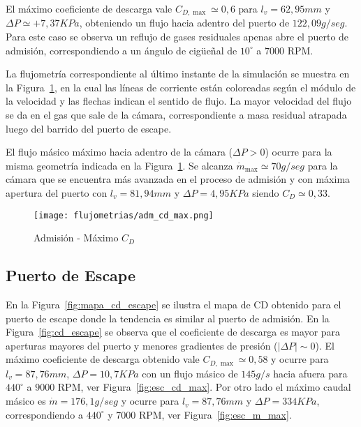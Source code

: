 El máximo coeficiente de descarga vale $C_{D,\max}\simeq 0,6$ para
$l_{v}=62,95 mm$ y $\Delta P\simeq +7,37 KPa$, obteniendo un flujo hacia adentro
del puerto de $122,09 g/seg$.
%
Para este caso se observa un reflujo de gases residuales apenas abre el puerto
de admisión, correspondiendo a un ángulo de cigüeñal de $10^{\circ}$ a $7000$
RPM.

La flujometría correspondiente al último instante de la simulación se muestra en
la Figura~\ref{fig:adm_cd_max}, en la cual las líneas de corriente están
coloreadas según el módulo de la velocidad y las flechas indican el sentido de
flujo.
%
La mayor velocidad del flujo se da en el gas que sale de la cámara,
correspondiente a masa residual atrapada luego del barrido del puerto de escape.


El flujo másico máximo hacia adentro de la cámara ($\Delta P>0$) ocurre para la
misma geometría indicada en la Figura~\ref{fig:adm_cd_max}.
%
Se alcanza $\dot{m}_{\max}\simeq 70 g/seg$ para la cámara que se encuentra más
avanzada en el proceso de admisión y con máxima apertura del puerto con
$l_{v}=81,94 mm$ y $\Delta P=4,95 KPa$ siendo $C_{D}\simeq 0,33$.

\begin{figure}[h]
    \centering
    \texttt{[image: flujometrias/adm\_cd\_max.png]}
    \caption{Admisión - Máximo $C_{D}$}\label{fig:adm_cd_max}
\end{figure}


\subsection{Puerto de Escape}
%
En la Figura~\ref{fig:mapa_cd_escape} se ilustra el mapa de CD obtenido para el
puerto de escape donde la tendencia es similar al puerto de admisión.
%
En la Figura~\ref{fig:cd_escape} se observa que el coeficiente de descarga es
mayor para aperturas mayores del puerto y menores gradientes de presión
($|\Delta P|\sim 0$).
%
El máximo coeficiente de descarga obtenido vale $C_{D,\max}\simeq 0,58$ y ocurre
para $l_{v}=87,76 mm$, $\Delta P=10,7 KPa$ con un flujo másico de $145 g/s$
hacia afuera para $440^{\circ}$ a $9000$ RPM, ver Figura~\ref{fig:esc_cd_max}.
%
Por otro lado el máximo caudal másico es $\dot{m}=176,1 g/seg$ y ocurre para
$l_{v}=87,76 mm$ y $\Delta P=334 KPa$, correspondiendo a $440^{\circ}$ y 7000
RPM, ver Figura~\ref{fig:esc_m_max}.

